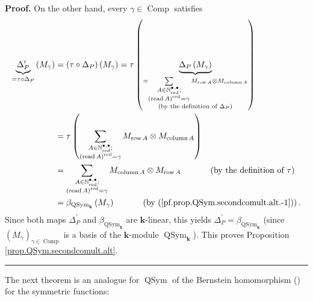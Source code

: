 \documentclass[numbers=enddot,12pt,final,onecolumn,notitlepage,abstracton]{scrartcl}%
\theoremstyle{definition}
\newenvironment{proof}[1][Proof]{\noindent\textbf{#1.} }{\ \rule{0.5em}{0.5em}}
\let\sumnonlimits\sum
\renewcommand{\sum}{\sumnonlimits\limits}
\begin{document}
\begin{proof}
On the other hand, every $\gamma\in\operatorname*{Comp}$ satisfies%
\begin{align*}
\underbrace{\Delta_{P}^{\prime}}_{=\tau\circ\Delta_{P}}\left(  M_{\gamma
}\right)   &  =\left(  \tau\circ\Delta_{P}\right)  \left(  M_{\gamma}\right)
=\tau\left(  \underbrace{\Delta_{P}\left(  M_{\gamma}\right)  }%
_{\substack{=\sum_{\substack{A\in\mathbb{N}_{\operatorname*{red}}%
^{\bullet,\bullet};\\\left(  \operatorname*{read}A\right)
^{\operatorname*{red}}=\gamma}}M_{\operatorname*{row}A}\otimes
M_{\operatorname*{column}A}\\\text{(by the definition of }\Delta_{P}\text{)}%
}}\right) \\
&  =\tau\left(  \sum_{\substack{A\in\mathbb{N}_{\operatorname*{red}}%
^{\bullet,\bullet};\\\left(  \operatorname*{read}A\right)
^{\operatorname*{red}}=\gamma}}M_{\operatorname*{row}A}\otimes
M_{\operatorname*{column}A}\right) \\
&  =\sum_{\substack{A\in\mathbb{N}_{\operatorname*{red}}^{\bullet,\bullet
}\text{;}\\\left(  \operatorname*{read}A\right)  ^{\operatorname*{red}}%
=\gamma}}M_{\operatorname*{column}A}\otimes M_{\operatorname*{row}%
A}\ \ \ \ \ \ \ \ \ \ \left(  \text{by the definition of }\tau\right) \\
&  =\beta_{\operatorname*{QSym}\nolimits_{\mathbf{k}}}\left(  M_{\gamma
}\right)  \ \ \ \ \ \ \ \ \ \ \left(  \text{by
(\ref{pf.prop.QSym.secondcomult.alt.-1})}\right)  .
\end{align*}
Since both maps $\Delta_{P}^{\prime}$ and $\beta_{\operatorname*{QSym}%
\nolimits_{\mathbf{k}}}$ are $\mathbf{k}$-linear, this yields $\Delta
_{P}^{\prime}=\beta_{\operatorname*{QSym}\nolimits_{\mathbf{k}}}$ (since
$\left(  M_{\gamma}\right)  _{\gamma\in\operatorname*{Comp}}$ is a basis of
the $\mathbf{k}$-module $\operatorname*{QSym}\nolimits_{\mathbf{k}}$). This
proves Proposition \ref{prop.QSym.secondcomult.alt}.
\end{proof}

The next theorem is an analogue for $\operatorname*{QSym}$ of the Bernstein
homomorphism (\cite[\S 18.24]{HazeWitt}) for the symmetric functions:
\end{document}
